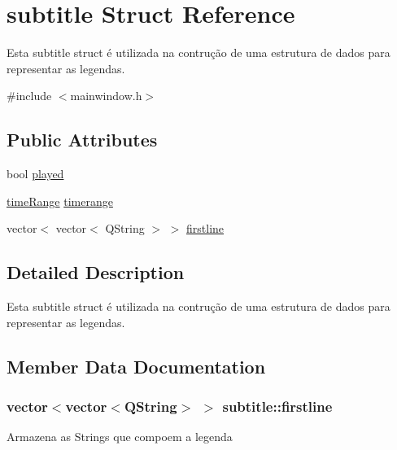 \hypertarget{structsubtitle}{}\section{subtitle Struct Reference}
\label{structsubtitle}


Esta subtitle struct é utilizada na contrução de uma estrutura de dados para representar as legendas.  




{\ttfamily \#include $<$mainwindow.\+h$>$}

\subsection*{Public Attributes}
\begin{DoxyCompactItemize}
\item 
bool \hyperlink{structsubtitle_a12b5d59da640a60de07892449a14b06a}{played}
\item 
\hyperlink{structtimeRange}{time\+Range} \hyperlink{structsubtitle_ae3c12c11840733f601353d28bad10b26}{timerange}
\item 
vector$<$ vector$<$ Q\+String $>$ $>$ \hyperlink{structsubtitle_a8ea20b5e81c5028fb612ecb13183cb28}{firstline}
\end{DoxyCompactItemize}


\subsection{Detailed Description}
Esta subtitle struct é utilizada na contrução de uma estrutura de dados para representar as legendas. 

\subsection{Member Data Documentation}
\hypertarget{structsubtitle_a8ea20b5e81c5028fb612ecb13183cb28}{}
\subsubsection[{firstline}]{\setlength{\rightskip}{0pt plus 5cm}vector$<$vector$<$Q\+String$>$ $>$ subtitle\+::firstline}\label{structsubtitle_a8ea20b5e81c5028fb612ecb13183cb28}
Armazena as Strings que compoem a legenda \hypertarget{structsubtitle_a12b5d59da640a60de07892449a14b06a}{}
